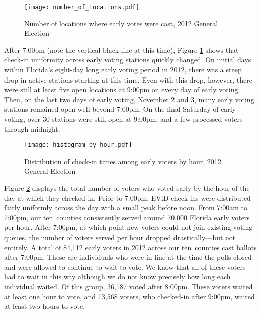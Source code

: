 \documentclass[12pt,titlepage]{article}
\newcommand{\numcounties}{ten}
\begin{document}
\begin{figure}[!ht]
  \caption{Number of locations where early votes were cast, 2012 General Election}
  \label{fig:nrlocs2012}
  \centering
    \centering\texttt{[image: number\_of\_Locations.pdf]}
\end{figure}

After 7:00pm (note the vertical black line at this time), Figure
\ref{fig:nrlocs2012} shows that check-in uniformity across early
voting stations quickly changed.  On initial days within Florida's
eight-day long early voting period in 2012, there was a steep drop in
active stations starting at this time.  Even with this drop, however,
there were still at least five open locations at 9:00pm on every day
of early voting.  Then, on the last two days of early voting, November
2 and 3, many early voting stations remained open well beyond 7:00pm.
On the final Saturday of early voting, over 30 stations were still
open at 9:00pm, and a few processed voters through midnight.

\begin{figure}[!ht]
\caption{Distribution of check-in times among early voters by hour, 2012 General Election}
  \label{fig:hist2012}
  \centering
    \centering\texttt{[image: histogram\_by\_hour.pdf]}
\end{figure}

Figure \ref{fig:hist2012} displays the total number of voters who
voted early by the hour of the day at which they checked-in. Prior to
7:00pm, EViD check-ins were distributed fairly uniformly across the
day with a small peak before noon.  From 7:00am to 7:00pm, our
\numcounties\ counties consistently served around 70,000 Florida early
voters per hour. After 7:00pm, at which point new voters could not
join existing voting queues, the number of voters served per hour
dropped drastically---but not entirely.  A total of 84,112 early
voters in 2012 across our \numcounties\ counties cast ballots after
7:00pm. These are individuals who were in line at the time the polls
closed and were allowed to continue to wait to vote.  We know that all
of these voters had to wait in this way although we do not know
precisely how long each individual waited.  Of this group, 36,187
voted after 8:00pm.  These voters waited at least one hour to vote,
and 13,568 voters, who checked-in after 9:00pm, waited at least two
hours to vote.

\end{document}
